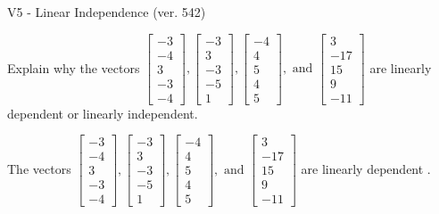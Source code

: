 \begin{exercise}
  \begin{exerciseTitle}V5 - Linear Independence (ver. 542)\end{exerciseTitle}
  \begin{exerciseStatement}
    Explain why the vectors \(\left[\begin{array}{r}
-3 \\
-4 \\
3 \\
-3 \\
-4
\end{array}\right] , \left[\begin{array}{r}
-3 \\
3 \\
-3 \\
-5 \\
1
\end{array}\right] , \left[\begin{array}{r}
-4 \\
4 \\
5 \\
4 \\
5
\end{array}\right] , \text{ and } \left[\begin{array}{r}
3 \\
-17 \\
15 \\
9 \\
-11
\end{array}\right]\) are linearly dependent or linearly independent.	


  \end{exerciseStatement}
  \begin{exerciseAnswer}
   The vectors \(\left[\begin{array}{r}
-3 \\
-4 \\
3 \\
-3 \\
-4
\end{array}\right] , \left[\begin{array}{r}
-3 \\
3 \\
-3 \\
-5 \\
1
\end{array}\right] , \left[\begin{array}{r}
-4 \\
4 \\
5 \\
4 \\
5
\end{array}\right] , \text{ and } \left[\begin{array}{r}
3 \\
-17 \\
15 \\
9 \\
-11
\end{array}\right]\) are 
  	 linearly dependent  .
  


  \end{exerciseAnswer}
\end{exercise}